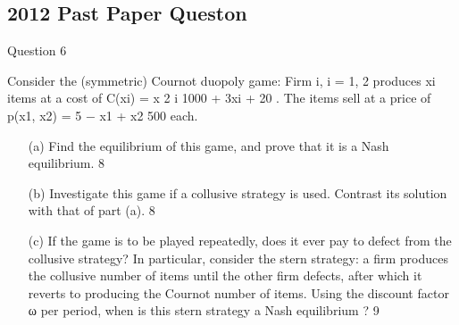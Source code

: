 \documentclass[a4paper,12pt]{article}
\begin{document}
\subsection{2012 Past Paper Queston}

Question 6 

Consider the (symmetric) Cournot duopoly game: Firm i, i = 1, 2 produces
xi
items at a cost of
C(xi) = x
2
i
1000 + 3xi + 20
. The items sell at a price of
p(x1, x2) = 5 −
x1 + x2
500
each.
\begin{itemize}
\item[(a)] Find the equilibrium of this game, and prove that it is a Nash equilibrium.
8 %
\item[(b)] Investigate this game if a collusive strategy is used. Contrast its solution
with that of part (a). 8 %
\item[(c)] If the game is to be played repeatedly, does it ever pay to defect from
the collusive strategy? In particular, consider the stern strategy: a firm
produces the collusive number of items until the other firm defects,
after which it reverts to producing the Cournot number of items. Using
the discount factor ω per period, when is this stern strategy a Nash
equilibrium ? 9 %
\end{itemize}
\end{document}

